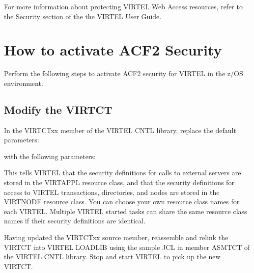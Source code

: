 \documentclass[letterpaper,10pt,english]{sphinxmanual}
\begin{document}
For more information about protecting VIRTEL Web Access resources, refer to the Security section of the the VIRTEL User Guide.

\ignorespaces 

\section{How to activate ACF2 Security}
\label{\detokenize{Installation_Guide:how-to-activate-acf2-security}}\label{\detokenize{Installation_Guide:index-182}}
Perform the following steps to activate ACF2 security for VIRTEL in the z/OS environment.


\subsection{Modify the VIRTCT}
\label{\detokenize{Installation_Guide:id10}}
In the VIRTCTxx member of the VIRTEL CNTL library, replace the default parameters:

\begin{sphinxVerbatim}[commandchars=\\\{\}]
\end{sphinxVerbatim}

with the following parameters:

\begin{sphinxVerbatim}[commandchars=\\\{\}]
\end{sphinxVerbatim}

This tells VIRTEL that the security definitions for calls to external servers are stored in the VIRTAPPL resource class, and that the security definitions for access to VIRTEL transactions, directories, and nodes are stored in the VIRTNODE resource class. You can choose your own resource class names for each VIRTEL. Multiple VIRTEL started tasks can share the same resource class names if their security definitions are identical.

Having updated the VIRTCTxx source member, reassemble and relink the VIRTCT into VIRTEL LOADLIB using the sample JCL in member ASMTCT of the VIRTEL CNTL library. Stop and start VIRTEL to pick up the new VIRTCT.
\end{document}
